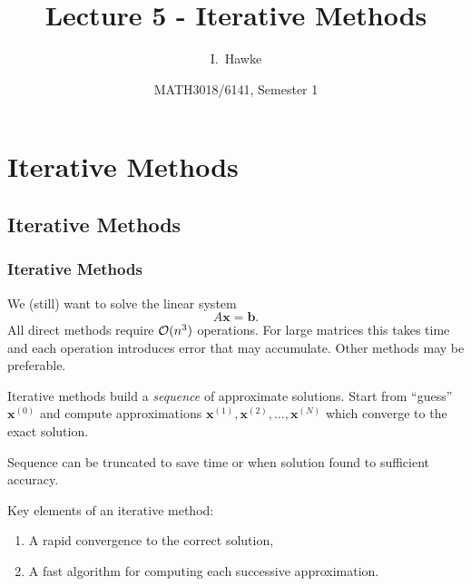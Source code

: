 \documentclass{beamer}
\title[Lecture 5] %
{Lecture 5 - Iterative Methods}
\author[I. Hawke]{I.~Hawke}
\institute[University of Southampton]%
{
  School of Mathematics, \\
  University of Southampton, UK
}
\date[Semester 1]{MATH3018/6141, Semester 1}
\newcommand{\bb}{{\boldsymbol{b}}}
\newcommand{\bx}{{\boldsymbol{x}}}
\begin{document}
\begin{frame}
  \titlepage
\end{frame}

\section{Iterative Methods}

\subsection{Iterative Methods}

\begin{frame}
  \frametitle{Iterative Methods}

   We (still) want to solve the linear system
   \begin{equation*}
     A \bx = \bb.
   \end{equation*}
   All direct methods require ${\cal O}(n^3)$ operations. For large
   matrices this takes time and each operation introduces error that
   may accumulate. Other methods may be preferable. \pause

   \vspace{1ex}

   Iterative methods build a \emph{sequence} of approximate
   solutions. Start from ``guess'' $\bx^{(0)}$ and compute
   approximations $\bx^{(1)}, \bx^{(2)}, \dots, \bx^{(N)}$ which
   converge to the exact solution.

   \vspace{1ex}

   Sequence can be truncated to save time or when solution found to
   sufficient accuracy. \pause

   \vspace{1ex}

   Key elements of an iterative method:
   \begin{enumerate}
   \item A rapid convergence to the correct solution,
   \item A fast algorithm for computing each successive approximation.
   \end{enumerate}

\end{frame}
\end{document}
